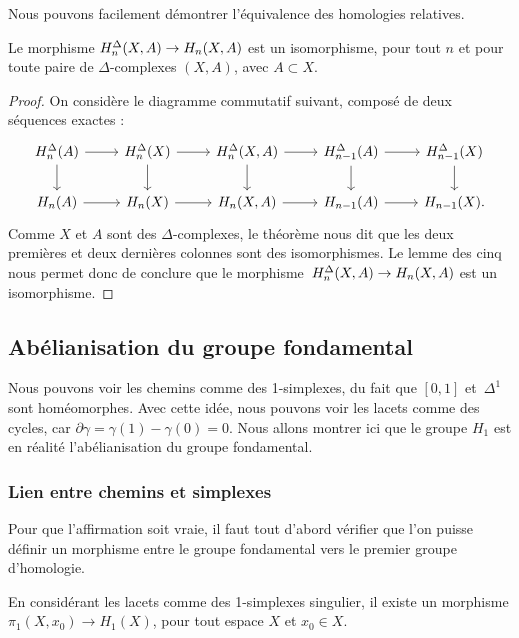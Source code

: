 Nous pouvons facilement démontrer l'équivalence des homologies relatives.

\begin{corollary}
Le morphisme $H^\Delta_n(X,A)\to H_n(X,A)$ est un isomorphisme, pour tout $n$ et pour toute paire de $\Delta$-complexes $(X,A)$, avec $A\subset X$.
\end{corollary}

\begin{proof}
On considère le diagramme commutatif suivant, composé de deux séquences exactes : \[\begin{tikzcd}
\homsimp_n(A)\arrow[r]\arrow[d]&\homsimp_n(X)\arrow[r]\arrow[d]&\homsimp_n(X,A)\arrow[r]\arrow[d]&\homsimp_{n-1}(A)\arrow[r]\arrow[d]&\homsimp_{n-1}(X)\arrow[d]\\
H_n(A)\arrow[r]&H_n(X)\arrow[r]&H_n(X,A)\arrow[r]&H_{n-1}(A)\arrow[r]&H_{n-1}(X).
\end{tikzcd}\]Comme $X$ et $A$ sont des $\Delta$-complexes, le théorème nous dit que les deux premières et deux dernières colonnes sont des isomorphismes. Le lemme des cinq nous permet donc de conclure que le morphisme~${H^\Delta_n(X,A)\to H_n(X,A)}$ est un isomorphisme.
\end{proof}

\subsection{Abélianisation du groupe fondamental}\label{sect:abelianisation}

Nous pouvons voir les chemins comme des 1-simplexes, du fait que $[0,1]$ et~$\Delta^1$ sont homéomorphes. Avec cette idée, nous pouvons voir les lacets comme des cycles, car ${\partial\gamma=\gamma(1)-\gamma(0)=0}$. Nous allons montrer ici que le groupe $H_1$ est en réalité l'abélianisation du groupe fondamental.

\subsubsection{Lien entre chemins et simplexes}

Pour que l'affirmation soit vraie, il faut tout d'abord vérifier que l'on puisse définir un morphisme entre le groupe fondamental vers le premier groupe d'homologie.

\begin{proposition}
En considérant les lacets comme des 1-simplexes singulier, il existe un morphisme $\pi_1(X,x_0)\to H_1(X)$, pour tout espace $X$ et $x_0\in X$.
\end{proposition}

